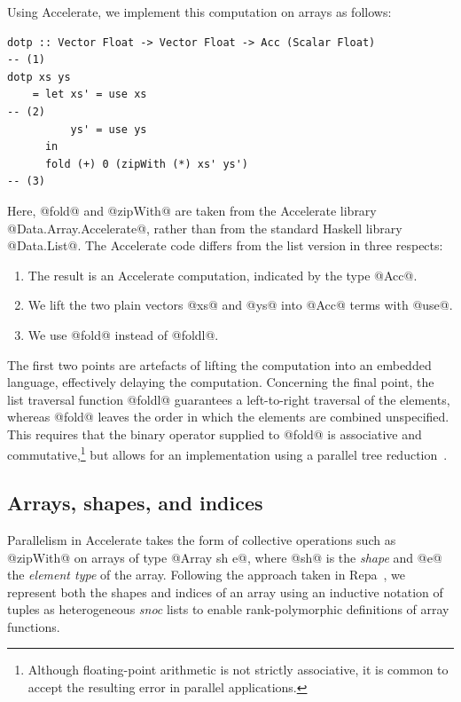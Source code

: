 Using Accelerate, we implement this computation on arrays as follows:
%
\begin{lstlisting}[style=haskell]
dotp :: Vector Float -> Vector Float -> Acc (Scalar Float)                         -- (1)
dotp xs ys
    = let xs' = use xs                                                             -- (2)
          ys' = use ys
      in
      fold (+) 0 (zipWith (*) xs' ys')                                             -- (3)
\end{lstlisting}
%
Here, @fold@ and @zipWith@ are taken from the Accelerate library
@Data.Array.Accelerate@, rather than from the standard Haskell library
@Data.List@. The Accelerate code differs from the list version in three
respects:
%
\begin{enumerate}
    \item The result is an Accelerate computation, indicated by the type @Acc@.
    \item We lift the two plain vectors @xs@ and @ys@ into @Acc@ terms with @use@.
    \item We use @fold@ instead of @foldl@.
\end{enumerate}
%
The first two points are artefacts of lifting the computation into an embedded
language, effectively delaying the computation. Concerning the final point, the
list traversal function @foldl@ guarantees a left-to-right traversal of the
elements, whereas @fold@ leaves the order in which the elements are combined
unspecified. This requires that the binary operator supplied to @fold@ is
associative and commutative,\footnote{Although floating-point arithmetic is not
strictly associative, it is common to accept the resulting error in parallel
applications.} but allows for an implementation using a parallel tree
reduction~\cite{Chatterjee:1990vj,Sengupta:2007tc}.


\subsection{Arrays, shapes, and indices}
\label{sec:arrays_shapes_and_indices}

Parallelism in Accelerate takes the form of collective operations such as
@zipWith@ on arrays of type @Array sh e@, where @sh@ is the \emph{shape} and @e@
the \emph{element type} of the array. Following the approach taken in
Repa~\cite{Keller:2010er}, we represent both the shapes and indices of an array
using an inductive notation of tuples as heterogeneous \emph{snoc} lists to
enable rank-polymorphic definitions of array functions.

